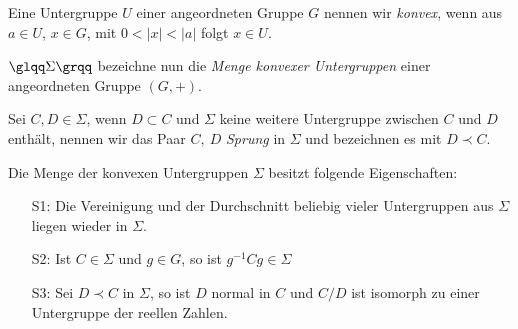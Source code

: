 \begin{defn}\label{konvexUGR} %
Eine Untergruppe $U$ einer angeordneten Gruppe $G$ nennen wir \textit{konvex}, wenn aus $a \in U$, $x \in G$, mit $0 < |x| < |a|$ folgt $x \in U$.\\
\end{defn}
$\glqq\Sigma\grqq$ bezeichne nun die \textit{Menge konvexer Untergruppen} einer angeordneten Gruppe $\left(G, +\right)$. 
\begin{defn}\label{Sprung} %
Sei $C, D \in \Sigma$, wenn $D \subset C$ und $\Sigma$ keine weitere Untergruppe zwischen $C$ und $D$ enthält, nennen wir das Paar $C,~D$ \textit{Sprung} in $\Sigma$ und bezeichnen es mit $D \prec C$.
\end{defn}
%
% 
%
%
\begin{satz}\label{EigenschaftenKonvexeUgr}
Die Menge der konvexen Untergruppen $\Sigma$ besitzt folgende Eigenschaften:
\begin{enumerate}
\item[S1:] Die Vereinigung und der Durchschnitt beliebig vieler Untergruppen aus $\Sigma$ liegen wieder in $\Sigma$.
\item[S2:] Ist $C \in\Sigma$ und $g \in G$, so ist $g^{-1}Cg\in \Sigma$
\item[S3:] Sei $D \prec C$ in $\Sigma$, so ist $D$ normal in $C$ und $C/D$ ist isomorph zu einer Untergruppe der reellen Zahlen.
\end{enumerate}
\end{satz}

